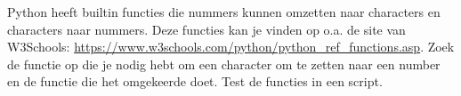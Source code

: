 Python heeft builtin functies die nummers kunnen omzetten naar characters en characters naar nummers. Deze functies kan je vinden op o.a. de site van W3Schools: \url{https://www.w3schools.com/python/python_ref_functions.asp}. Zoek de functie op die je nodig hebt om een character om te zetten naar een number en de functie die het omgekeerde doet. Test de functies in een script.

